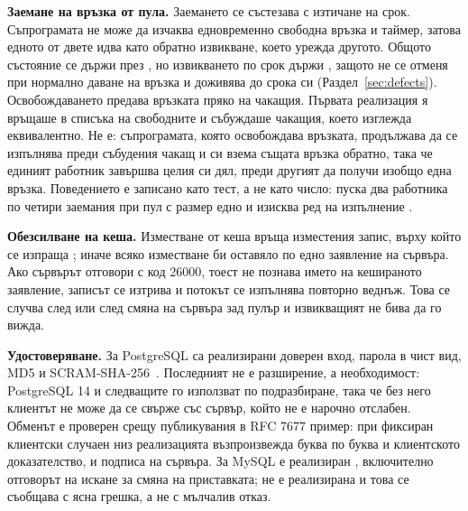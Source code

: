 \textbf{Заемане на връзка от пула.} Заемането се състезава с изтичане на срок. Съпрограмата
не може да изчаква едновременно свободна връзка и таймер, затова едното от двете идва като
обратно извикване, което урежда другото. Общото състояние се държи през , но
извикването по срок държи , защото не се отменя при нормално даване на
връзка и доживява до срока си (Раздел~\ref{sec:defects}).
Освобождаването предава връзката пряко на чакащия. Първата реализация я връщаше в списъка на
свободните и събуждаше чакащия, което изглежда еквивалентно. Не е: съпрограмата, която
освобождава връзката, продължава да се изпълнява преди събудения чакащ и си взема същата
връзка обратно, така че единият работник завършва целия си дял, преди другият да получи
изобщо една връзка. Поведението е записано като тест, а не като число:
 пуска два работника по
четири заемания при пул с размер едно и изисква ред на изпълнение .

\textbf{Обезсилване на кеша.} Изместване от кеша връща изместения запис, върху който се
изпраща ; иначе всяко изместване би оставяло по едно заявление на сървъра. Ако
сървърът отговори с код 26000, тоест не познава името на кешираното заявление, записът се
изтрива и потокът се изпълнява повторно веднъж. Това се случва след  или
след смяна на сървъра зад пулър и извикващият не бива да го вижда.

\textbf{Удостоверяване.} За PostgreSQL са реализирани доверен вход, парола в чист вид, MD5 и
SCRAM-SHA-256~\cite{rfc7677}. Последният не е разширение, а необходимост: PostgreSQL 14 и
следващите го използват по подразбиране, така че без него клиентът не може да се свърже със
сървър, който не е нарочно отслабен. Обменът е проверен срещу публикувания в RFC 7677 пример:
при фиксиран клиентски случаен низ реализацията възпроизвежда буква по буква и клиентското
доказателство, и подписа на сървъра. За MySQL е реализиран ,
включително отговорът на искане за смяна на приставката;  не е
реализирана и това се съобщава с ясна грешка, а не с мълчалив отказ.

